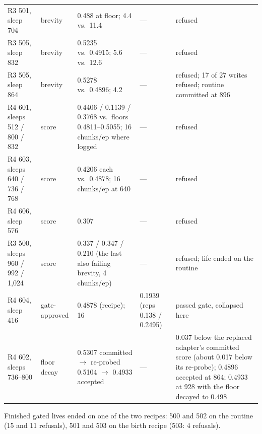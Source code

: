 \documentclass{article}
\begin{document}
\begin{table}[h]
\begin{tabular}{p{2.2cm}p{2.0cm}p{3.4cm}p{3.1cm}p{2.2cm}}
R3 501, sleep 704 & brevity & 0.488 at floor; 4.4 vs.\ 11.4 & --- & refused \\
R3 505, sleep 832 & brevity & 0.5235 vs.\ 0.4915; 5.6 vs.\ 12.6 & --- & refused \\ %
R3 505, sleep 864 & brevity & 0.5278 vs.\ 0.4896; 4.2 & --- & refused; 17 of 27 writes refused; routine committed at 896 \\ %
R4 601, sleeps 512 / 800 / 832 & score & 0.4406 / 0.1139 / 0.3768 vs.\ floors 0.4811--0.5055; 16 chunks/ep where logged & --- & refused \\ %
R4 603, sleeps 640 / 736 / 768 & score & 0.4206 each vs.\ 0.4878; 16 chunks/ep at 640 & --- & refused \\ %
R4 606, sleep 576 & score & 0.307 & --- & refused \\ %
R3 500, sleeps 960 / 992 / 1{,}024 & score & 0.337 / 0.347 / 0.210 (the last also failing brevity, 4 chunks/ep) & --- & refused; life ended on the routine \\ %
R4 604, sleep 416 & gate-approved & 0.4878 (recipe); 16 & 0.1939 (reps 0.138 / 0.2495) & passed gate, collapsed here \\ %
R4 602, sleeps 736--800 & floor decay & 0.5307 committed $\to$ re-probed 0.5104 $\to$ 0.4933 accepted & --- & 0.037 below the replaced adapter's committed score (about 0.017 below its re-probe); 0.4896 accepted at 864; 0.4933 at 928 with the floor decayed to 0.498 \\ %
\bottomrule
\end{tabular}
\end{table}
Finished gated lives ended on one of the two recipes: 500 and 502 on the routine (15 and 11 refusals), 501 and 503 on the birth recipe (503: 4 refusals).
\end{document}
